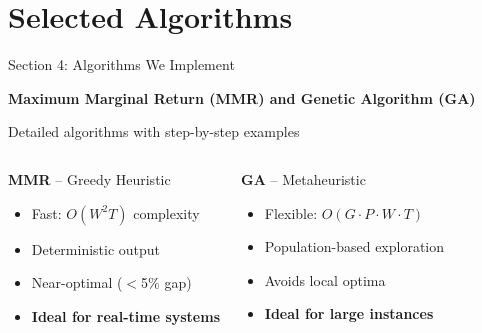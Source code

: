 \documentclass[aspectratio=43,8pt]{beamer}
\begin{document}
\section{Selected Algorithms}

\begin{frame}{Section 4: Algorithms We Implement}
\begin{center}
{\Large\textcolor{primaryblue}{\textbf{Maximum Marginal Return (MMR) and Genetic Algorithm (GA)}}}

\vspace{0.3cm}
{\normalsize Detailed algorithms with step-by-step examples}
\end{center}

\vspace{0.2cm}
\begin{columns}[t]
\begin{block}{\textbf{MMR} -- Greedy Heuristic}
\begin{itemize}
    \item Fast: $O(W^2T)$ complexity
    \item Deterministic output
    \item Near-optimal ($<$5\% gap)
    \item \textbf{Ideal for real-time systems}
\end{itemize}
\end{block}

\begin{alertblock}{\textbf{GA} -- Metaheuristic}
\begin{itemize}
    \item Flexible: $O(G \cdot P \cdot W \cdot T)$
    \item Population-based exploration
    \item Avoids local optima
    \item \textbf{Ideal for large instances}
\end{itemize}
\end{alertblock}
\end{columns}
\end{frame}
\end{document}
